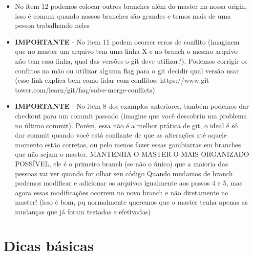 \documentclass[12pt]{article}
\begin{document}
\begin{doublespacing}
\begin{itemize}
\item{No item 12 podemos colocar outros branches além do master na nossa origin, isso é comum quando nossos branches são grandes e temos mais de uma pessoa trabalhando neles
}

\item{\textbf{IMPORTANTE} - No item 11 podem ocorrer erros de conflito (imaginem que no master um arquivo tem uma linha X e no branch o mesmo arquivo não tem essa linha, qual das versões o git deve utilizar?). Podemos corrigir os conflitos na mão ou utilizar alguma flag para o git decidir qual versão usar (esse link explica bem como lidar com conflitos: https://www.git-tower.com/learn/git/faq/solve-merge-conflicts)
}

\item \textbf{IMPORTANTE} - No item 8 dos examplos anteriores, também podemos dar checkout para um commit passado (imagine que você descobriu um problema no último commit). Porém, essa não é a melhor prática de git, o ideal é só dar commit quando você está confiante de que as alterações até aquele momento estão corretas, ou pelo menos fazer essas gambiarras em branches que não sejam o master. MANTENHA O MASTER O MAIS ORGANIZADO POSSÍVEL, ele é o primeiro branch (se não o único) que a maioria das pessoas vai ver quando for olhar seu código
\newline
Quando mudamos de branch podemos modificar e adicionar os arquivos igualmente aos passos 4 e 5, mas agora essas modificações ocorrem no novo branch e não diretamente no master! (isso é bom, pq normalmente queremos que o master tenha apenas as mudanças que já foram testadas e efetivadas)

\label{checkout_c}
\end{itemize}

\section{Dicas básicas}

\end{doublespacing}
\end{document}
